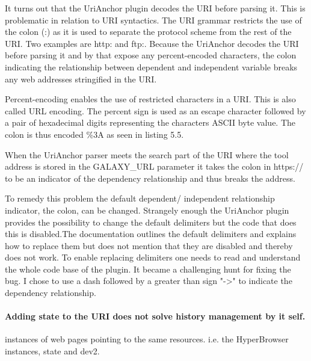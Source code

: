 \documentclass[english]{ifimaster}
\begin{document}
It turns out that the UriAnchor plugin decodes the URI before parsing it. This is problematic in relation to URI syntactics. The URI grammar restricts the use of the colon (:) as it is used to separate the protocol scheme from the rest of the URI. Two examples are http: and ftp:. Because the UriAnchor decodes the URI before parsing it and by that expose any percent-encoded characters, the colon indicating the relationship between dependent and independent variable breaks any web addresses stringified in the URI. 

Percent-encoding enables the use of restricted characters in a URI. This is also called URL encoding. The percent sign is used as an escape character followed by a pair of hexadecimal digits representing the characters ASCII byte value\parencite{urlencode}. The colon is thus encoded \%3A as seen in listing 5.5.

When the UriAnchor parser meets the search part of the URI where the tool address is stored in the GALAXY\_URL parameter it takes the colon in https:// to be an indicator of the dependency relationship and thus breaks the address.

To remedy this problem the default dependent/ independent relationship indicator, the colon, can be changed. Strangely enough the UriAnchor plugin provides the possibility to change the default delimiters but the code that does this is disabled.The documentation outlines the default delimiters and explains how to replace them but does not mention that they are disabled and thereby does not work. To enable replacing delimiters one needs to read and understand the whole code base of the plugin. It became a challenging hunt for fixing the bug. I chose to use a dash followed by a greater than sign "->" to indicate the dependency relationship.   

\paragraph{Adding state to the URI does not solve history management by it self.} 




instances of web pages pointing to the same resources. i.e. the HyperBrowser instances, state and dev2.

\end{document}
